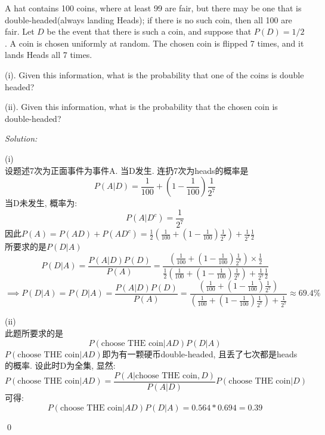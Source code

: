 \documentclass[12pt]{article}
\newenvironment{problem}[2][Problem]{\begin{trivlist}
\item[\hskip \labelsep {\bfseries #1}\hskip \labelsep {\bfseries #2.}]}{\end{trivlist}}
\newenvironment{sol}
    {\emph{Solution:}
    }
    {
    \qed
    }
\newcommand{\f}[2]{\frac{#1}{#2}}                                      %
\newcommand{\ff}[1]{\frac{1}{#1}}                                      %
\newcommand\ip{\implies}                                               %
\newcommand\tm{\times}                                                 %
\begin{document}
\begin{problem}{6}
A hat contains 100 coins, where at least 99 are fair, but there may be one that is double-headed(always
landing Heads); if there is no such coin, then all 100 are fair. Let $D$ be the event that there is such a coin, and suppose that $P(D) = 1/2$. A coin is chosen uniformly at random. The chosen coin is flipped 7 times, and it lands Heads all 7 times.

(i). Given this information, what is the probability that one of the coins is double headed?

(ii). Given this information, what is the probability that the chosen coin is double-headed?
\end{problem}
\begin{sol}

    (i)\\
    设题述7次为正面事件为事件A. 当D发生. 连扔7次为heads的概率是
    $$P(A|D) = \ff{100} + (1-\ff{100})\ff{2^7}$$
    当D未发生, 概率为: 
    $$P(A|D^c) = \ff{2^7}$$
    因此$P(A)= P(AD)+P(AD^c) = \ff{2}(\ff{100} + (1-\ff{100})\ff{2^7})   +   \ff{2^7}\ff{2}$\\
    所要求的是$P(D|A)$
    $$P(D|A) =\f{P(A|D)P(D)}{P(A)} = \f{(\ff{100} + (1-\ff{100})\ff{2^7})\tm\ff{2}}{\ff{2}(\ff{100} + (1-\ff{100})\ff{2^7})+\ff{2^7}\ff{2}}$$
    $$\ip P(D|A) = P(D|A) =\f{P(A|D)P(D)}{P(A)} = \f{(\ff{100} + (1-\ff{100})\ff{2^7})}{(\ff{100} + (1-\ff{100})\ff{2^7})+\ff{2^7}} \approx 69.4\%$$

    (ii)\\
    此题所要求的是
    $$P(\text{choose THE coin}|AD)P(D|A)$$
    $P(\text{choose THE coin}|AD)$即为有一颗硬币double-headed, 且丢了七次都是heads的概率. 设此时D为全集, 显然: 
    $$P(\text{choose THE coin}|AD) = \f{P(A|\text{choose THE coin},D)}{P(A|D)}{P(\text{choose THE coin}|D)}$$
    可得: 
    $$P(\text{choose THE coin}|AD)P(D|A) = 0.564*0.694 = 0.39$$

\end{sol}
\end{document}
